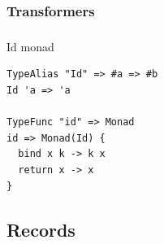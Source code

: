 \subsubsection{Transformers}
\begin{frame}[fragile]
   \frametitle{\subsecname}
   \framesubtitle{\subsubsecname}
   Id monad
   \begin{lstlisting}
TypeAlias "Id" => #a => #b
Id 'a => 'a

TypeFunc "id" => Monad
id => Monad(Id) {
  bind x k -> k x
  return x -> x
}
   \end{lstlisting}
\end{frame}

\subsection{Records}

